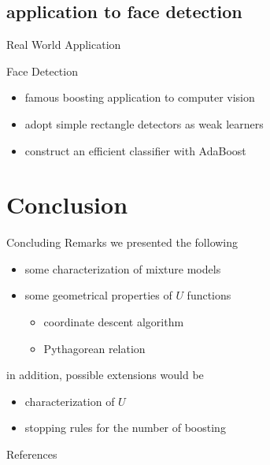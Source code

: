 \documentclass[fleqn,aspectratio=1610]{beamer}
\begin{document}
\subsection{application to face detection}
\label{sec:orgc838a58}
\begin{frame}[label={sec:org7f57128}]{Real World Application}
\begin{exampleblock}{Face Detection}\label{sec:org8deab8c}
\end{exampleblock}
\begin{itemize}
\item famous boosting application to computer vision
\item adopt simple rectangle detectors as weak learners
\item construct an efficient classifier with AdaBoost
\end{itemize}

\nocite{ViolaJones2004,DomingoWatanabe2000colt}
\end{frame}
\section{Conclusion}
\label{sec:org8972839}
\begin{frame}[label={sec:org00deafa}]{Concluding Remarks}
we presented the following

\begin{itemize}
\item some characterization of mixture models
\item some geometrical properties of \(U\) functions
\begin{itemize}
\item coordinate descent algorithm
\item Pythagorean relation
\end{itemize}
\end{itemize}

in addition, possible extensions would be

\begin{itemize}
\item characterization of \(U\)
\item stopping rules for the number of boosting
\end{itemize}
\end{frame}
\begin{frame}[allowframebreaks]{References}
\printbibliography[heading=none]
\end{frame}
\end{document}
